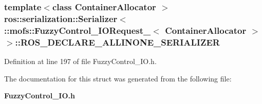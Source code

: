 \subsubsection[{R\-O\-S\-\_\-\-D\-E\-C\-L\-A\-R\-E\-\_\-\-A\-L\-L\-I\-N\-O\-N\-E\-\_\-\-S\-E\-R\-I\-A\-L\-I\-Z\-E\-R}]{\setlength{\rightskip}{0pt plus 5cm}template$<$class Container\-Allocator $>$ ros\-::serialization\-::\-Serializer$<$ \-::{\bf mofs\-::\-Fuzzy\-Control\-\_\-\-I\-O\-Request\-\_\-}$<$ Container\-Allocator $>$ $>$\-::R\-O\-S\-\_\-\-D\-E\-C\-L\-A\-R\-E\-\_\-\-A\-L\-L\-I\-N\-O\-N\-E\-\_\-\-S\-E\-R\-I\-A\-L\-I\-Z\-E\-R}\label{structros_1_1serialization_1_1Serializer_3_01_1_1mofs_1_1FuzzyControl__IORequest___3_01ContainerAllocator_01_4_01_4_a0dd1f55d39dcab4dd0b5af6f710e83fa}


Definition at line 197 of file Fuzzy\-Control\-\_\-\-I\-O.\-h.



The documentation for this struct was generated from the following file\-:\begin{DoxyCompactItemize}
\item 
{\bf Fuzzy\-Control\-\_\-\-I\-O.\-h}\end{DoxyCompactItemize}

